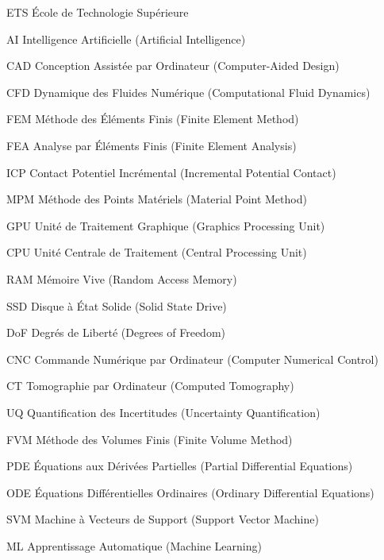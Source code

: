 \begin{listofabbr}[3cm]
    \item [ETS] École de Technologie Supérieure
    \item [AI] Intelligence Artificielle (Artificial Intelligence)
    \item [CAD] Conception Assistée par Ordinateur (Computer-Aided Design)
    \item [CFD] Dynamique des Fluides Numérique (Computational Fluid Dynamics)
    \item [FEM] Méthode des Éléments Finis (Finite Element Method)
    \item [FEA] Analyse par Éléments Finis (Finite Element Analysis)
    \item [ICP] Contact Potentiel Incrémental (Incremental Potential Contact)
    \item [MPM] Méthode des Points Matériels (Material Point Method)
    \item [GPU] Unité de Traitement Graphique (Graphics Processing Unit)
    \item [CPU] Unité Centrale de Traitement (Central Processing Unit)
    \item [RAM] Mémoire Vive (Random Access Memory)
    \item [SSD] Disque à État Solide (Solid State Drive)

    \item [DoF] Degrés de Liberté (Degrees of Freedom)
    \item [CNC] Commande Numérique par Ordinateur (Computer Numerical Control)
    \item [CT] Tomographie par Ordinateur (Computed Tomography)
    \item [UQ] Quantification des Incertitudes (Uncertainty Quantification)
    \item [FVM] Méthode des Volumes Finis (Finite Volume Method)
    \item [PDE] Équations aux Dérivées Partielles (Partial Differential Equations)
    \item [ODE] Équations Différentielles Ordinaires (Ordinary Differential Equations)

    \item [SVM] Machine à Vecteurs de Support (Support Vector Machine)
    \item [ML] Apprentissage Automatique (Machine Learning)
\end{listofabbr}
